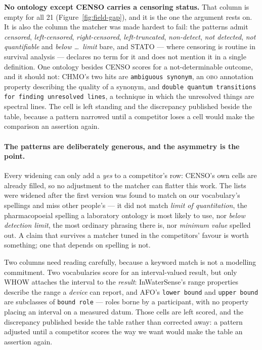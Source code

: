 \textbf{No ontology except CENSO carries a censoring status.} That column is
empty for all \num{21} (Figure~\ref{fig:field-gap}), and it is the one the
argument rests on. It is also the
column the matcher was made hardest to fail: the patterns admit
\emph{censored}, \emph{left-censored}, \emph{right-censored},
\emph{left-truncated}, \emph{non-detect}, \emph{not detected},
\emph{not quantifiable} and \emph{below \dots\ limit} bare, and STATO --- where
censoring is routine in survival analysis --- declares no term for it and does
not mention it in a single definition. One ontology besides CENSO scores for a
not-determinable outcome, and it should not: CHMO's two hits are
\texttt{ambiguous synonym}, an \textsc{obo} annotation property describing the
quality of a synonym, and \texttt{double quantum transitions for finding
unresolved lines}, a technique in which the unresolved things are spectral
lines. The cell is left standing and the discrepancy published beside the table,
because a pattern narrowed until a competitor loses a cell would make the
comparison an assertion again.

\paragraph{The patterns are deliberately generous, and the asymmetry is the
point.} Every widening can only add a \emph{yes} to a competitor's row: CENSO's
own cells are already filled, so no adjustment to the matcher can flatter this
work. The lists were widened after the first version was found to match on our
vocabulary's spellings and miss other people's --- it did not match
\emph{limit of quantitation}, the pharmacopoeial spelling a laboratory ontology
is most likely to use, nor \emph{below detection limit}, the most ordinary
phrasing there is, nor \emph{minimum value} spelled out. A claim that survives a
matcher tuned in the competitors' favour is worth something; one that depends on
spelling is not.

Two columns need reading carefully, because a keyword match is not a modelling
commitment. Two vocabularies score for an interval-valued result, but only WHOW
attaches the interval to the \emph{result}: InWaterSense's range properties
describe the range a \emph{device} can report, and AFO's \texttt{lower bound}
and \texttt{upper bound} are subclasses of \texttt{bound role} --- roles borne
by a participant, with no property placing an interval on a measured datum.
Those cells are left scored, and the discrepancy published beside the table
rather than corrected away: a pattern adjusted until a competitor scores the way
we want would make the table an assertion again.

